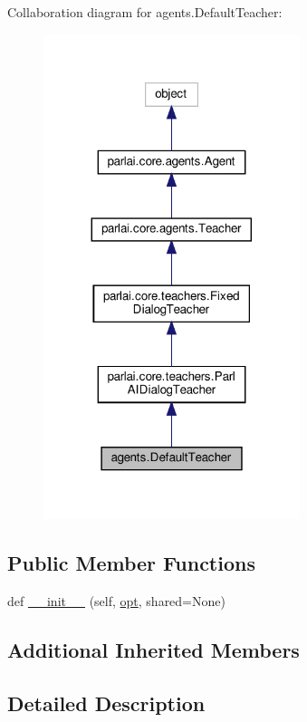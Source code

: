 Collaboration diagram for agents.\+Default\+Teacher\+:
\nopagebreak
\begin{figure}[H]
\begin{center}
\leavevmode
\includegraphics[width=212pt]{classagents_1_1DefaultTeacher__coll__graph}
\end{center}
\end{figure}
\subsection*{Public Member Functions}
\begin{DoxyCompactItemize}
\item 
def \hyperlink{classagents_1_1DefaultTeacher_a0055a4fda9308a8ab022ba742256434d}{\+\_\+\+\_\+init\+\_\+\+\_\+} (self, \hyperlink{classparlai_1_1core_1_1agents_1_1Teacher_a3ce6243860ce978a897922863ed32fa4}{opt}, shared=None)
\end{DoxyCompactItemize}
\subsection*{Additional Inherited Members}


\subsection{Detailed Description}


